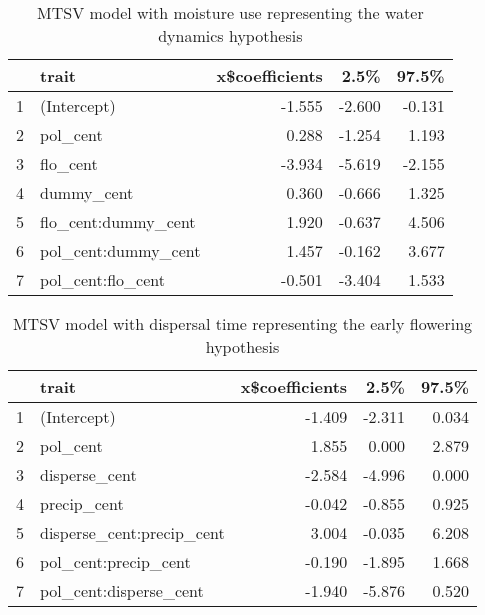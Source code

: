 \documentclass[11pt]{article}\usepackage[]{graphicx}\usepackage[]{color}
\begin{document}
\begin{table}[H]
\centering
\begin{tabular}{rlrrr}
  \hline
 & trait & x\$coefficients & 2.5\% & 97.5\% \\ 
  \hline
1 & (Intercept) & -1.555 & -2.600 & -0.131 \\ 
  2 & pol\_cent & 0.288 & -1.254 & 1.193 \\ 
  3 & flo\_cent & -3.934 & -5.619 & -2.155 \\ 
  4 & dummy\_cent & 0.360 & -0.666 & 1.325 \\ 
  5 & flo\_cent:dummy\_cent & 1.920 & -0.637 & 4.506 \\ 
  6 & pol\_cent:dummy\_cent & 1.457 & -0.162 & 3.677 \\ 
  7 & pol\_cent:flo\_cent & -0.501 & -3.404 & 1.533 \\ 
   \hline
\end{tabular}
\caption{MTSV model with moisture use representing the water dynamics hypothesis} 
\label{moist_mtsv_physilogical}
\end{table}

\begin{table}[H]
\centering
\begin{tabular}{rlrrr}
  \hline
 & trait & x\$coefficients & 2.5\% & 97.5\% \\ 
  \hline
1 & (Intercept) & -1.409 & -2.311 & 0.034 \\ 
  2 & pol\_cent & 1.855 & 0.000 & 2.879 \\ 
  3 & disperse\_cent & -2.584 & -4.996 & 0.000 \\ 
  4 & precip\_cent & -0.042 & -0.855 & 0.925 \\ 
  5 & disperse\_cent:precip\_cent & 3.004 & -0.035 & 6.208 \\ 
  6 & pol\_cent:precip\_cent & -0.190 & -1.895 & 1.668 \\ 
  7 & pol\_cent:disperse\_cent & -1.940 & -5.876 & 0.520 \\ 
   \hline
\end{tabular}
\caption{MTSV model with dispersal time representing the early flowering hypothesis} 
\label{disperse_mtsv_physilogical}
\end{table}
\end{document}
